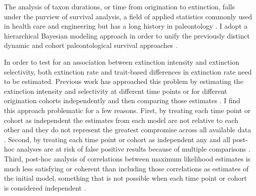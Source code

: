 \documentclass[11pt]{article}
\begin{document}
The analysis of taxon durations, or time from origination to extinction, falls under the purview of survival analysis, a field of applied statistics commonly used in health care and engineering \citep{Klein2003} but has a long history in paleontology \citep{Simpson1944,Simpson1953,VanValen1973,VanValen1979,Smits2015,Crampton2016}. I adopt a hierarchical Bayesian modeling approach \citep{Gelman2007,Gelman2013d} in order to unify the previously distinct dynamic and cohort paleontological survival approaches \citep{VanValen1973,VanValen1979,Raup1978,Raup1975,Foote1988,Baumiller1993,Simpson2006,Crampton2016,Ezard2012b}. 

In order to test for an association between extinction intensity and extinction selectivity, both extinction rate and trait-based differences in extinction rate need to be estimated. Previous work has approached this problem by estimating the extinction intensity and selectivity at different time points or for different origination cohorts independently and then comparing those estimates \citep{Payne2016}. I find this approach problematic for a few reasons. First, by treating each time point or cohort as independent the estimates from each model are not relative to each other and they do not represent the greatest compromise across all available data \citep{Gelman2013d}. Second, by treating each time point or cohort as independent any and all post-hoc analyses are at risk of false positive results because of multiple comparisons \citep{Gelman2013d}. Third, post-hoc analysis of correlations between maximum likelihood estimates is much less satisfying or coherent than including those correlations as estimates of the initial model, something that is not possible when each time point or cohort is considered independent \citep{Gelman2013d}. 

\end{document}
